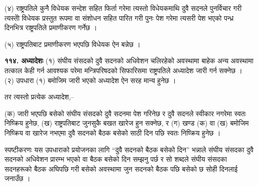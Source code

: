 (४) राष्ट्रपतिले कुनै विधेयक सन्देश सहित फिर्ता गरेमा त्यस्तो विधेयकमाथि दुवै सदनले पुनर्विचार गरी त्यस्तोे विधेयक प्रस्तुत रूपमा वा
संशोधन सहित पारित गरी पुनः पेश गरेमा त्यसरी पेश भएको पन्ध्र दिनभित्र राष्ट्रपतिले प्रमाणीकरण गर्नेछ ।

(५) राष्ट्रपतिबाट प्रमाणीकरण भएपछि विधेयक ऐन बन्नेछ ।

\textbf{११४. अध्यादेशः} (१) संघीय संसदको दुवै सदनको अधिवेशन चलिरहेको अवस्थामा बाहेक अन्य अवस्थामा तत्काल केही गर्न आवश्यक परेमा मन्त्रिपरिषदको सिफारिसमा राष्ट्रपतिले अध्यादेश जारी गर्न सक्नेछ । (२) उपधारा (१) बमोजिम जारी भएको अध्यादेश ऐन सरह मान्य हुनेछ ।

तर त्यस्तो प्रत्येक अध्यादेश,–

(क) जारी भएपछि बसेको संघीय संसदको दुवै सदनमा पेश गरिनेछ र दुवै सदनले स्वीकार नगरेमा स्वतः निष्क्रिय हुनेछ,
(ख) राष्ट्रपतिबाट जुनसुकै बखत खारेज हुन सक्नेछ, र
(ग) खण्ड (क) वा (ख) बमोजिम निष्क्रिय वा खारेज नभएमा दुवै सदनको बैठक बसेको साठी दिन पछि स्वतः निष्क्रिय हुनेछ ।

स्पष्टीकरणः यस उपधाराको प्रयोजनका लागि “दुवै सदनको बैठक बसेको दिन” भन्नाले संघीय संसदका दुवै सदनको अधिवेशन प्रारम्भ भएको वा बैठक बसेको दिन सम्झनु पर्छ र सो शब्दले संघीय संसदका सदनहरूको बैठक अघिपछि गरी बसेको अवस्थामा जुन सदनको बैठक पछि बसेको छ सोही दिनलाई जनाउँछ ।